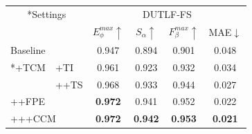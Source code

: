 \begin{table}
	\centering
	\label{table:abl_total}
		\begin{tabular}{llcccc}
			\toprule  %
			
			\multicolumn{2}{c}{ \multirow{2}*{Settings}}	& \multicolumn{4}{c}{DUTLF-FS} \\ %
			
			\cmidrule(r){3-6} 
			
			& & $E_{\phi}^{max}\uparrow$ & $S_{\alpha }\uparrow $ & $F_{\beta}^{max}\uparrow$ & MAE$\downarrow$ \\
			\midrule
			
			\multicolumn{2}{l}{ Baseline }     & 0.947 & 0.894 & 0.901 & 0.048 \\ 
			
			
			\midrule
			
			\multicolumn{1}{c}{ \multirow{2}*{+TCM}}	
			
			& +TI		& 0.961 & 0.923 & 0.932 & 0.034 \\ 
			& ++TS & 0.968 & 0.933 & 0.944 & 0.027 \\
			\midrule
			
			\multicolumn{2}{l}{++FPE} 		& \textbf{0.972} & 0.941 & 0.952 & 0.022 \\
			\multicolumn{2}{l}{+++CCM} 		& \textbf{0.972} & \textbf{0.942} & \textbf{0.953} & \textbf{0.021} \\ 
			
			
			\bottomrule
	\end{tabular}
\end{table}

